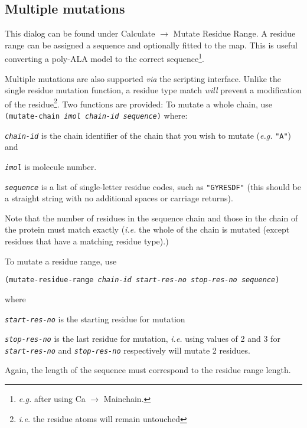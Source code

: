 \documentclass{book}
\begin{document}
\subsection{Multiple mutations}
This dialog can be found under \textsf{Calculate $\rightarrow$ Mutate
  Residue Range}.  A residue range can be assigned a sequence and
optionally fitted to the map.  This is useful converting a poly-ALA
model to the correct sequence\footnote{\emph{e.g.} after using Ca
  $\rightarrow$ Mainchain.}.

Multiple mutations are also supported \emph{via}
the scripting interface.  Unlike the single residue mutation function,
a residue type match \emph{will} prevent a modification of the
residue\footnote{\emph{i.e.} the residue atoms will remain untouched}.
Two functions are provided: To mutate a whole chain, use
\texttt{(mutate-chain \emph{imol} \emph{chain-id sequence})} where:

\texttt{\emph{chain-id}} is the chain identifier of the chain that you wish
to mutate (\emph{e.g.} \texttt{"A"}) and 

\texttt{\emph{imol}} is molecule number.  

\texttt{\emph{sequence}} is a list of single-letter residue codes,
such as \texttt{"GYRESDF"} (this should be a straight string with no
additional spaces or carriage returns).

Note that the number of residues in the sequence chain and those in
the chain of the protein must match exactly (\emph{i.e.} the whole of
  the chain is mutated (except residues that have a matching residue
  type).)

To mutate a residue range, use 

\begin{trivlist}
\item 
\texttt{(mutate-residue-range \emph{chain-id}
  \emph{start-res-no} \emph{stop-res-no \newline sequence})}
\end{trivlist}

where

\texttt{\emph{start-res-no}} is the starting residue for mutation

\texttt{\emph{stop-res-no}} is the last residue for mutation, \emph{i.e.}
using values of 2 and 3 for \texttt{\emph{start-res-no}} and
\texttt{\emph{stop-res-no}} respectively will mutate 2 residues.

Again, the length of the sequence must correspond to the residue range
length.
\end{document}
